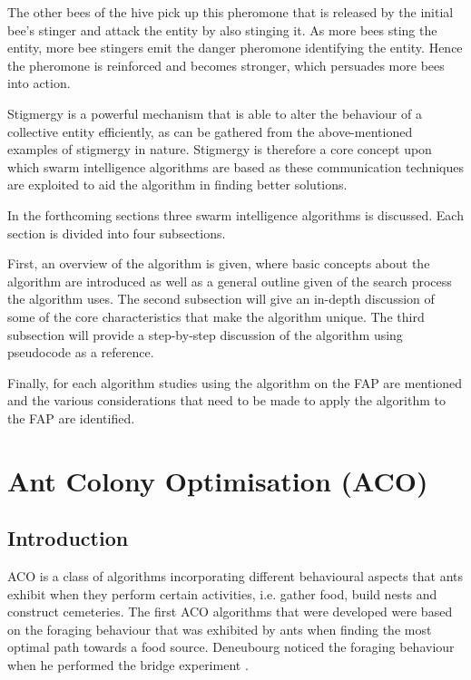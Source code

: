 The other bees of the hive pick up this pheromone that is released by the initial bee's stinger and attack the entity by also stinging it\cite{stigmergicoptimization}. As more bees sting the entity, more bee stingers emit the danger pheromone identifying the entity\cite{stigmergicoptimization}. Hence the pheromone is reinforced and becomes stronger, which persuades more bees into action\cite{stigmergicoptimization}.

Stigmergy is a powerful mechanism that is able to alter the behaviour of a collective entity efficiently, as can be gathered from the above-mentioned examples of stigmergy in nature\cite{AntsAndStigmergy,CompuIntelligenceIntro,AntIntroTrends}. Stigmergy is therefore a core concept upon which swarm intelligence algorithms are based as these communication techniques are exploited to aid the algorithm in finding better solutions\cite{AntsAndStigmergy,CompuIntelligenceIntro,AntIntroTrends}.

In the forthcoming sections three swarm intelligence algorithms is discussed. Each section is divided into four subsections. 

First, an overview of the algorithm is given, where basic concepts about the algorithm are introduced as well as a general outline given of the search process the algorithm uses. 
The second subsection will give an in-depth discussion of some of the core characteristics that make the algorithm unique. 
The third subsection will provide a step-by-step discussion of the algorithm using pseudocode as a reference.

Finally, for each algorithm studies using the algorithm on the FAP are mentioned and the various considerations that need to be made to apply the algorithm to the FAP are identified.

\section{Ant Colony Optimisation (ACO)}
\label{sec:ACO}
\subsection{Introduction}
\label{sec:ACOverview}
ACO is a class of algorithms incorporating different behavioural aspects that ants exhibit when they perform certain activities, i.e. gather food, build nests and construct cemeteries\cite{AntsAndStigmergy,CompuIntelligenceIntro}. The first ACO algorithms that were developed were based on the foraging behaviour that was exhibited by ants when finding the most optimal path towards a food source. Deneubourg noticed the foraging behaviour when he performed the bridge experiment \cite{AntsAndStigmergy,CompuIntelligenceIntro}.

